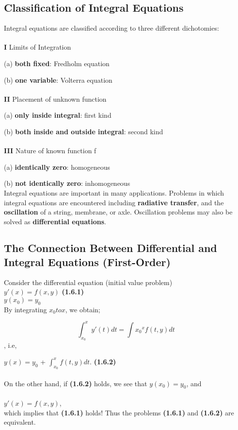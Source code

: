 \documentclass[12pt]{article}
\begin{document}
\subsection{Classification of Integral Equations}
\par Integral equations are classified according to three different dichotomies:\\
\\
\textbf{I}   Limits of Integration
\par (a) \textbf{both fixed}: Fredholm equation
\par (b) \textbf{one variable}: Volterra equation\\
\\
\textbf{II}   Placement of unknown function
\par (a) \textbf{only inside integral}: first kind
\par (b) \textbf{both inside and outside integral}: second kind\\
\\
\textbf{III} Nature of known function f
\par (a) \textbf{identically zero}: homogeneous
\par(b) \textbf{not identically zero}: inhomogeneous\\

Integral equations are important in many applications. Problems in which integral equations are encountered including \textbf{radiative transfer}, and the \textbf{oscillation} of a string, membrane, or axle. Oscillation problems may also be solved as \textbf{differential equations}.
\newpage
\subsection{The Connection Between Differential and Integral Equations (First-Order)}
Consider the differential equation (initial value problem)\\
$y'(x) = f(x,y)$	\textbf{(1.6.1)}\\
$y(x_0) = y_0$\\
By integrating $x_0 to x$, we obtain;

\[\int_{x_0}^{x} y'(t)dt = \int{x_0}^{x} f(t,y)dt\] ,
i.e,

$y(x) = y_0$ + \(\int_{x_0}^{x} f(t,y)dt\).		\textbf{(1.6.2)}\\
\\

On the other hand, if \textbf{(1.6.2)} holds, we see that $y(x_0) = y_0$, and\\
\\
$y'(x) = f(x,y)$,\\
which implies that \textbf{(1.6.1)} holds! Thus the problems \textbf{(1.6.1)} and \textbf{(1.6.2)} are equivalent.
\end{document}
